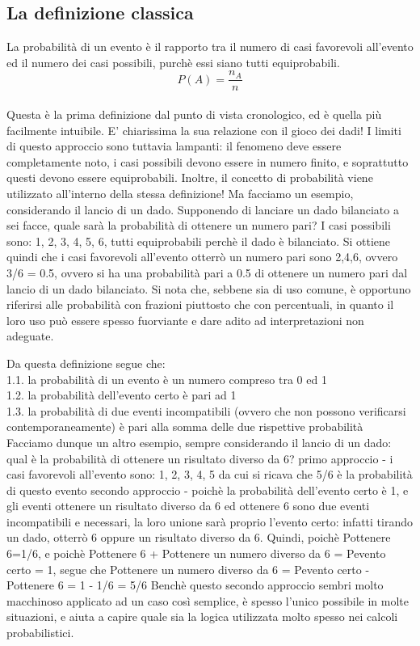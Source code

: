 \documentclass[a4paper]{article}
\begin{document}
\subsection{La definizione classica}
La probabilit\`{a} di un evento \`{e} il rapporto tra il numero di casi favorevoli all'evento ed il numero dei casi possibili, purch\`{e} essi siano tutti equiprobabili.
\\
\[
 P(A)=\frac{n_A}{n}
\]
\\
Questa \`{e} la prima definizione dal punto di vista cronologico, ed \`{e} quella più facilmente intuibile. E' chiarissima la sua relazione con il gioco dei dadi!
I limiti di questo approccio sono tuttavia lampanti: il fenomeno deve essere completamente noto, i casi possibili devono essere in numero finito, e soprattutto questi devono essere equiprobabili. Inoltre, il concetto di probabilit\`{a} viene utilizzato all'interno della stessa definizione!
Ma facciamo un esempio, considerando il lancio di un dado.
Supponendo di lanciare un dado bilanciato a sei facce, quale sar\`{a} la probabilit\`{a} di ottenere un numero pari?
I casi possibili sono: {1, 2, 3, 4, 5, 6}, tutti equiprobabili perch\`{e} il dado \`{e} bilanciato.
Si ottiene quindi che i casi favorevoli all'evento {otterrò un numero pari} sono {2,4,6}, ovvero 3/6 = 0.5, ovvero si ha una probabilit\`{a} pari a 0.5 di ottenere un numero pari dal lancio di un dado bilanciato.
Si nota che, sebbene sia di uso comune, \`{e} opportuno riferirsi alle probabilit\`{a} con frazioni piuttosto che con percentuali, in quanto il loro uso può essere spesso fuorviante e dare adito ad interpretazioni non adeguate.

Da questa definizione segue che:\\
1.1. la probabilit\`{a} di un evento \`{e} un numero compreso tra 0 ed 1\\
1.2. la probabilit\`{a} dell'evento certo \`{e} pari ad 1\\
1.3. la probabilit\`{a} di due eventi incompatibili (ovvero che non possono verificarsi contemporaneamente) \`{e} pari alla somma delle due rispettive probabilit\`{a}\\

Facciamo dunque un altro esempio, sempre considerando il lancio di un dado: qual \`{e} la probabilit\`{a} di ottenere un risultato diverso da 6?
primo approccio - i casi favorevoli all'evento sono: {1, 2, 3, 4, 5} da cui si ricava che 5/6 \`{e} la probabilit\`{a} di questo evento
secondo approccio - poich\`{e} la probabilit\`{a} dell'evento certo \`{e} 1, e gli eventi {ottenere un risultato diverso da 6} ed {ottenere 6} sono due eventi incompatibili e necessari, la loro unione sar\`{a} proprio l'evento certo: infatti tirando un dado, otterrò 6 oppure un risultato diverso da 6. Quindi, poich\`{e} P{ottenere 6}=1/6, e poich\`{e} P{ottenere 6} + P{ottenere un numero diverso da 6} = P{evento certo} = 1, segue che P{ottenere un numero diverso da 6} = P{evento certo} - P{ottenere 6} = 1 - 1/6 = 5/6
Bench\`{e} questo secondo approccio sembri molto macchinoso applicato ad un caso così semplice, \`{e} spesso l'unico possibile in molte situazioni, e aiuta a capire quale sia la logica utilizzata molto spesso nei calcoli probabilistici.
\end{document}
